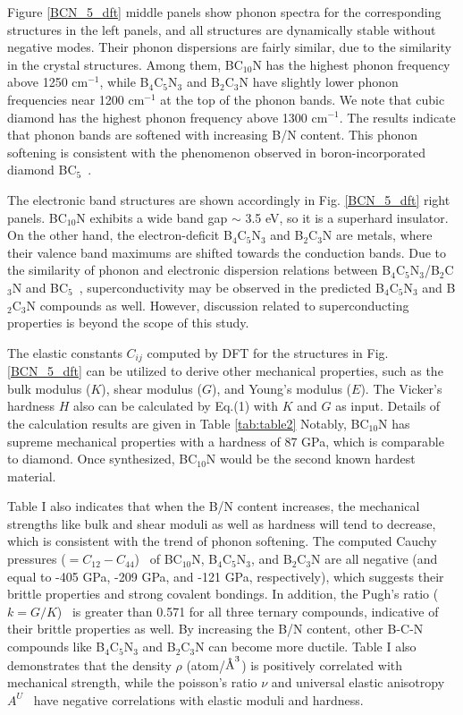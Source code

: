 	
	Figure \ref{BCN_5_dft} middle panels show phonon spectra for the corresponding structures in the left panels, and all structures are dynamically stable without negative modes. Their phonon dispersions are fairly similar, due to the similarity in the crystal structures.
	Among them, BC$_{10}$N has the highest phonon frequency above 1250 cm$^{-1}$, while B$_4$C$_5$N$_3$ and B$_2$C$_3$N have slightly lower phonon frequencies near 1200 cm$^{-1}$ at the top of the phonon bands. 
	We note that cubic diamond has the highest phonon frequency above 1300 cm$^{-1}$. The results indicate that phonon bands are softened with increasing B/N content. This phonon softening is consistent with the phenomenon observed in boron-incorporated diamond BC$_5$~\cite{baker2018computational}.
	
	The electronic band structures are shown accordingly in Fig. \ref{BCN_5_dft} right panels. BC$_{10}$N exhibits a wide band gap $\sim$ 3.5 eV, so it is a superhard insulator. On the other hand, the electron-deficit B$_4$C$_5$N$_3$ and B$_2$C$_3$N are metals, where their valence band maximums are shifted towards the conduction bands. Due to the similarity of phonon and electronic dispersion relations between B$_4$C$_5$N$_3$/B$_2$C$_3$N and BC$_5$~\cite{baker2018computational,PhysRevB.80.094106, BC5_SC}, superconductivity may be observed in the predicted B$_4$C$_5$N$_3$ and B$_2$C$_3$N compounds as well. However, discussion related to superconducting properties is beyond the scope of this study. 
	
	The elastic constants $C_{ij}$ computed by DFT for the structures in Fig. \ref{BCN_5_dft} can be utilized to derive other mechanical properties, such as the bulk modulus ($K$), shear modulus ($G$), and Young's modulus ($E$). The Vicker's hardness $H$ also can be calculated by Eq.(1) with $K$ and $G$ as input. Details of the calculation results are given in Table \ref{tab:table2}
	Notably, BC$_{10}$N has supreme mechanical properties with a hardness of 87 GPa, which is comparable to diamond. Once synthesized, BC$_{10}$N would be the second known hardest material.
	
	Table I also indicates that when the B/N content increases, the mechanical \newline strengths like bulk and shear moduli as well as hardness will tend to decrease, which is consistent with the trend of phonon softening. The computed Cauchy pressures ($= C_{12}-C_{44}$)~\cite{PhysRevB.86.134106} of BC$_{10}$N, B$_4$C$_5$N$_3$, and B$_2$C$_3$N are all negative (and equal to -405 GPa, -209 GPa, and -121 GPa, respectively), which suggests their brittle properties and strong covalent bondings. 
	In addition, the Pugh's ratio ($k = G/K$)~\cite{Pugh} is greater than 0.571 for all three ternary compounds, indicative of their brittle properties as well. 
	By increasing the B/N content, other B-C-N compounds like B$_4$C$_5$N$_3$ and B$_2$C$_3$N can become more ductile.
	Table I also demonstrates that the density $\rho$ (atom/$\text{\normalfont\AA}^3$) is positively correlated with mechanical strength, while the poisson's ratio $\nu$ and universal elastic anisotropy $A^U$~\cite{Univ_Ela_Aniso} have negative correlations with elastic moduli and hardness.
	

